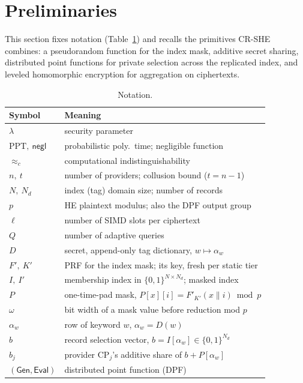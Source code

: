 \documentclass[a4paper,fleqn]{cas-dc}
\newcommand{\negl}{\mathsf{negl}}
\newcommand{\PPT}{\mathrm{PPT}}
\newcommand{\cind}{\approx_c}
\newcommand{\Gen}{\mathsf{Gen}}
\newcommand{\Eval}{\mathsf{Eval}}
\begin{document}
\section{Preliminaries}
\label{sec:prelim}

This section fixes notation (Table~\ref{tab:notation}) and recalls the
primitives CR-SHE combines: a pseudorandom function for the index mask,
additive secret sharing, distributed point functions for private selection
across the replicated index, and leveled homomorphic encryption for
aggregation on ciphertexts.

\begin{table}[pos=t]
\caption{Notation.}
\label{tab:notation}
\centering
\footnotesize
\setlength{\tabcolsep}{4pt}
\begin{tabular}{@{}l>{\raggedright\arraybackslash}p{5.5cm}@{}}
\toprule
Symbol & Meaning \\
\midrule
$\lambda$ & security parameter \\
$\PPT,\ \negl$ & probabilistic poly.\ time; negligible function \\
$\cind$ & computational indistinguishability \\
$n,\ t$ & number of providers; collusion bound ($t=n-1$) \\
$N,\ N_d$ & index (tag) domain size; number of records \\
$p$ & HE plaintext modulus; also the DPF output group \\
$\ell$ & number of SIMD slots per ciphertext \\
$Q$ & number of adaptive queries \\
$D$ & secret, append-only tag dictionary, $w\mapsto\alpha_w$ \\
$F',\ K'$ & PRF for the index mask; its key, fresh per static tier \\
$I,\ I'$ & membership index in $\{0,1\}^{N\times N_d}$; masked index \\
$P$ & one-time-pad mask, $P[x][i]=F'_{K'}(x\|i)\bmod p$ \\
$\omega$ & bit width of a mask value before reduction mod $p$ \\
$\alpha_w$ & row of keyword $w$, $\alpha_w=D(w)$ \\
$b$ & record selection vector, $b=I[\alpha_w]\in\{0,1\}^{N_d}$ \\
$b_j$ & provider $\text{CP}_j$'s additive share of $b+P[\alpha_w]$ \\
$(\Gen,\Eval)$ & distributed point function (DPF) \\

\end{tabular}
\end{table}
\end{document}
